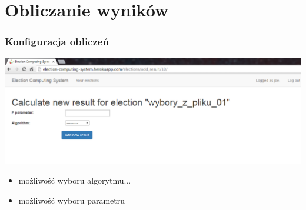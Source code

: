 \documentclass{beamer}
\begin{document}
\section{Obliczanie wyników}
\begin{frame}
\frametitle{Konfiguracja obliczeń}
\includegraphics[width=0.8\paperwidth]{screenshots/12_add_new_result.png}
\begin{itemize}
\item możliwość wyboru algorytmu...
\item możliwość wyboru parametru
\end{itemize}
\end{frame}
\end{document}
